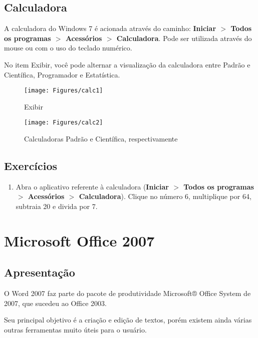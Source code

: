 \documentclass[hidelinks,12pt]{article}
\begin{document}
			\subsection{Calculadora}

			A calculadora do Windows 7 é acionada através do caminho: {\bf Iniciar $>$ Todos os programas $>$ Acessórios $>$ Calculadora}. Pode ser utilizada através do mouse ou com o uso do teclado numérico.
			
			No item Exibir, você pode alternar a visualização da calculadora entre Padrão e Científica, Programador e Estatística.	
			
			\begin{figure}[!h]
				\centering
				\texttt{[image: Figures/calc1]}
				\label{fig:calc1}
				\caption{Exibir}
			\end{figure}
			
			\begin{figure}[!h]
				\centering
				\texttt{[image: Figures/calc2]}
				\label{fig:calc2}
				\caption{Calculadoras Padrão e Científica, respectivamente}
			\end{figure}
			
		\subsection{Exercícios}
			
		\begin{enumerate}
			\item Abra o aplicativo referente à calculadora ({\bf Iniciar $>$ Todos os programas $>$ Acessórios $>$ Calculadora}). Clique no número 6, multiplique por 64, subtraia 20 e divida por 7.
		\end{enumerate}
			
	\section{Microsoft Office 2007}
	
	\subsection{Apresentação}
	
	O Word 2007 faz parte do pacote de produtividade Microsoft® Office System de 2007, que sucedeu ao Office 2003.

	Seu principal objetivo é a criação e edição de textos, porém existem ainda várias outras ferramentas muito úteis para o usuário.
		
\end{document}
